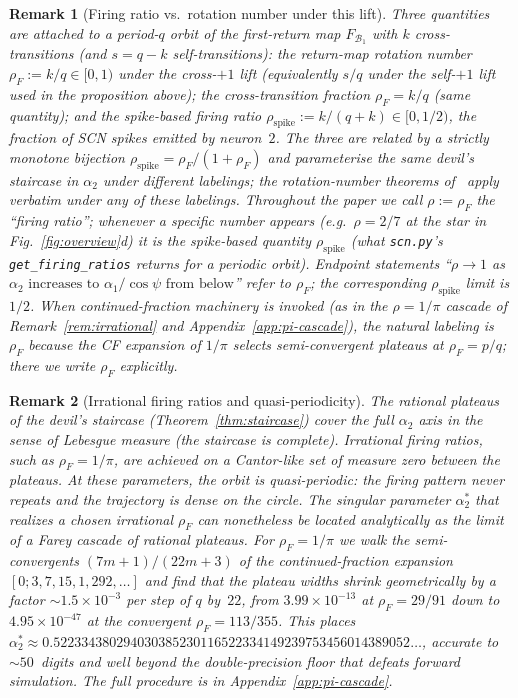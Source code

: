 \documentclass[12pt]{article}
\newcommand{\Bsp}{\mathcal{B}}
\newtheorem{remark}{Remark}
\begin{document}
\begin{remark}[Firing ratio vs.\ rotation number under this lift]\label{app-rem:rho-conventions}
Three quantities are attached to a period-$q$ orbit of the first-return map $F_{\!\Bsp_1}$ with $k$ cross-transitions (and $s=q{-}k$ self-transitions): the \emph{return-map rotation number} $\rho_F := k/q\in[0,1)$ under the cross-$+1$ lift (equivalently $s/q$ under the self-$+1$ lift used in the proposition above); the \emph{cross-transition fraction} $\rho_F = k/q$ (same quantity); and the \emph{spike-based firing ratio} $\rho_{\text{spike}} := k/(q{+}k) \in [0,1/2)$, the fraction of SCN spikes emitted by neuron~$2$. The three are related by a strictly monotone bijection $\rho_{\text{spike}}=\rho_F/(1+\rho_F)$ and parameterise the \emph{same} devil's staircase in $\alpha_2$ under different labelings; the rotation-number theorems of~\citet{rhodes1991topologies,alseda2000combinatorial} apply verbatim under any of these labelings. Throughout the paper we call $\rho:=\rho_F$ the ``firing ratio''; whenever a specific number appears (e.g.\ $\rho=2/7$ at the star in Fig.~\ref{fig:overview}d) it is the spike-based quantity $\rho_{\text{spike}}$ (what \texttt{scn.py}'s \texttt{get\_firing\_ratios} returns for a periodic orbit). Endpoint statements ``$\rho\to 1$ as $\alpha_2 \text{ increases to } \alpha_1/\cos\psi \text{ from below}$'' refer to $\rho_F$; the corresponding $\rho_{\text{spike}}$ limit is $1/2$. When continued-fraction machinery is invoked (as in the $\rho=1/\pi$ cascade of Remark~\ref{rem:irrational} and Appendix~\ref{app:pi-cascade}), the natural labeling is $\rho_F$ because the CF expansion of $1/\pi$ selects semi-convergent plateaus at $\rho_F=p/q$; there we write $\rho_F$ explicitly.
\end{remark}

\begin{remark}[Irrational firing ratios and quasi-periodicity]\label{app-rem:irrational}
The rational plateaus of the devil's staircase (Theorem~\ref{thm:staircase}) cover the full $\alpha_2$ axis in the sense of Lebesgue measure (the staircase is \emph{complete}).
Irrational firing ratios, such as $\rho_F=1/\pi$, are achieved on a Cantor-like set of measure zero between the plateaus.
At these parameters, the orbit is quasi-periodic: the firing pattern never repeats and the trajectory is dense on the circle.
The singular parameter $\alpha_2^*$ that realizes a chosen irrational $\rho_F$ can nonetheless be located analytically as the limit of a Farey cascade of rational plateaus.
For $\rho_F=1/\pi$ we walk the semi-convergents $(7m{+}1)/(22m{+}3)$ of the continued-fraction expansion $[0;3,7,15,1,292,\ldots]$ and find that the plateau widths shrink geometrically by a factor ${\sim}1.5\times 10^{-3}$ per step of $q$ by~$22$, from $3.99\times 10^{-13}$ at $\rho_F=29/91$ down to $4.95\times 10^{-47}$ at the convergent $\rho_F=113/355$.
This places $\alpha_2^*\approx 0.522334380294030385230116522334149239753456014389052\ldots$, accurate to ${\sim}50$~digits and well beyond the double-precision floor that defeats forward simulation.
The full procedure is in Appendix~\ref{app:pi-cascade}.
\end{remark}
\end{document}
